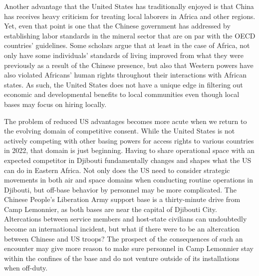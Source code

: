 Another advantage that the United States has traditionally enjoyed is that China has receives heavy criticism for treating local laborers in Africa and other regions. Yet, even that point is one that the Chinese government has addressed by establishing labor standards in the mineral sector that are on par with the OECD countries' guidelines.\cite{Buhmann2017} Some scholars argue that at least in the case of Africa, not only have some individuals' standards of living improved from what they were previously as a result of the Chinese presence, but also that Western powers have also violated Africans' human rights throughout their interactions with African states. As such, the United States does not have a unique edge in filtering out economic and developmental benefits to local communities even though local bases may focus on hiring locally. 

The problem of reduced US advantages becomes more acute when we return to the evolving domain of competitive consent. While the United States is not actively competing with other basing powers for access rights to various countries in 2022, that domain is just beginning. Having to share operational space with an expected competitor in Djibouti fundamentally changes and shapes what the US can do in Eastern Africa. Not only does the US need to consider strategic movements in both air and space domains when conducting routine operations in Djibouti, but off-base behavior by personnel may be more complicated. The Chinese People's Liberation Army support base is a thirty-minute drive from Camp Lemonnier, as both bases are near the capital of Djibouti City. Altercations between service members and host-state civilians can undoubtedly become an international incident, but what if there were to be an altercation between Chinese and US troops?\cite{Bryant1979} The prospect of the consequences of such an encounter may give more reason to make sure personnel in Camp Lemonnier stay within the confines of the base and do not venture outside of its installations when off-duty. 

